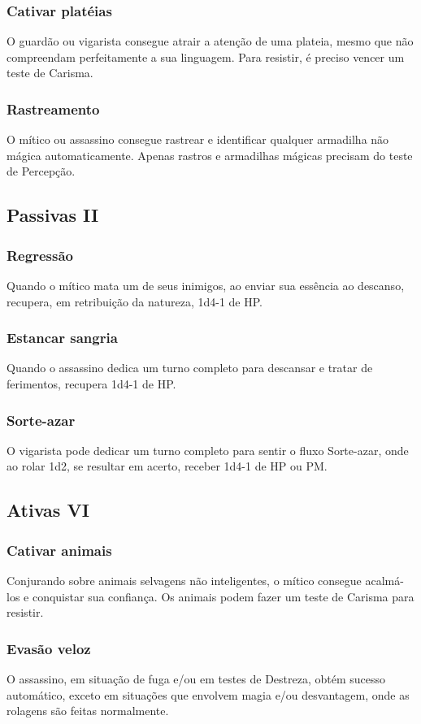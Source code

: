 \documentclass[10pt,twoside,twocolumn]{book}
\begin{document}
\subsubsection*{Cativar platéias}
O guardão ou vigarista consegue atrair a atenção de uma plateia, mesmo que não compreendam perfeitamente a sua linguagem. Para resistir, é preciso vencer um teste de Carisma.
\subsubsection*{Rastreamento}
O mítico ou assassino consegue rastrear e identificar qualquer armadilha não mágica automaticamente. Apenas rastros e armadilhas mágicas precisam do teste de Percepção.

\subsection*{Passivas II}
\subsubsection*{Regressão}
Quando o mítico mata um de seus inimigos, ao enviar sua essência ao descanso, recupera, em retribuição da natureza, 1d4-1 de HP.
\subsubsection*{Estancar sangria}
Quando o assassino dedica um turno completo para descansar e tratar de ferimentos, recupera 1d4-1 de HP.
\subsubsection*{Sorte-azar}
O vigarista pode dedicar um turno completo para sentir o fluxo Sorte-azar, onde ao rolar 1d2, se resultar em acerto, receber 1d4-1 de HP ou PM.

\subsection*{Ativas VI}
\subsubsection*{Cativar animais}
Conjurando sobre animais selvagens não inteligentes, o mítico consegue acalmá-los e conquistar sua confiança. Os animais podem fazer um teste de Carisma para resistir.
\subsubsection*{Evasão veloz}
O assassino, em situação de fuga e/ou em testes de Destreza, obtém sucesso automático, exceto em situações que envolvem magia e/ou desvantagem, onde as rolagens são feitas normalmente.
\end{document}
